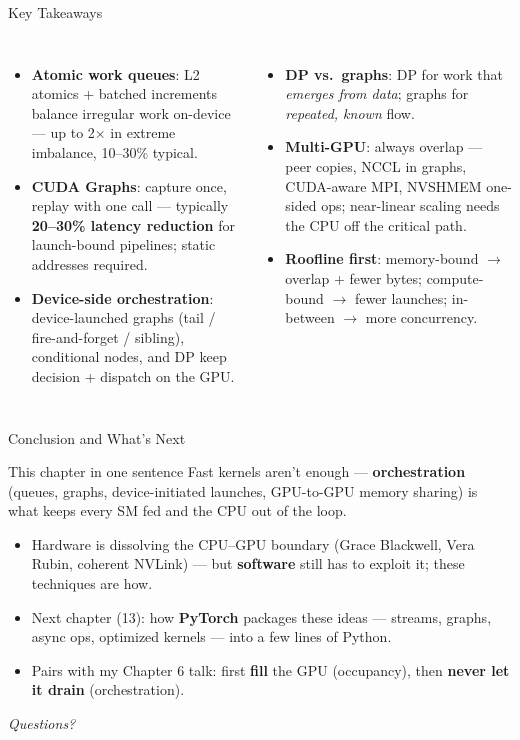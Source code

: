 \documentclass[aspectratio=169]{beamer}
\newcommand{\kw}[1]{\textbf{\textcolor{kwblue}{#1}}}
\begin{document}
\begin{frame}{Key Takeaways}
  \begin{columns}[t]
    \begin{itemize}\small
      \item \kw{Atomic work queues}: L2 atomics + batched increments balance irregular work
            on-device --- up to 2$\times$ in extreme imbalance, 10--30\% typical.
      \item \kw{CUDA Graphs}: capture once, replay with one call --- typically
            \kw{20--30\% latency reduction} for launch-bound pipelines; static addresses required.
      \item \kw{Device-side orchestration}: device-launched graphs (tail / fire-and-forget /
            sibling), conditional nodes, and DP keep decision + dispatch on the GPU.
    \end{itemize}
    \begin{itemize}\small
      \item \kw{DP vs.\ graphs}: DP for work that \emph{emerges from data};
            graphs for \emph{repeated, known} flow.
      \item \kw{Multi-GPU}: always overlap --- peer copies, NCCL in graphs, CUDA-aware MPI,
            NVSHMEM one-sided ops; near-linear scaling needs the CPU off the critical path.
      \item \kw{Roofline first}: memory-bound $\to$ overlap + fewer bytes;
            compute-bound $\to$ fewer launches; in-between $\to$ more concurrency.
    \end{itemize}
  \end{columns}
\end{frame}

\begin{frame}{Conclusion and What's Next}
  \begin{block}{This chapter in one sentence}
    Fast kernels aren't enough --- \kw{orchestration} (queues, graphs, device-initiated launches,
    GPU-to-GPU memory sharing) is what keeps every SM fed and the CPU out of the loop.
  \end{block}
  \begin{itemize}
    \item Hardware is dissolving the CPU--GPU boundary (Grace Blackwell, Vera Rubin, coherent
          NVLink) --- but \kw{software} still has to exploit it; these techniques are how.
    \item Next chapter (13): how \kw{PyTorch} packages these ideas --- streams, graphs, async ops,
          optimized kernels --- into a few lines of Python.
    \item Pairs with my Chapter 6 talk: first \kw{fill} the GPU (occupancy),
          then \kw{never let it drain} (orchestration).
  \end{itemize}
  \medskip
  \centering\itshape Questions?
\end{frame}
\end{document}
